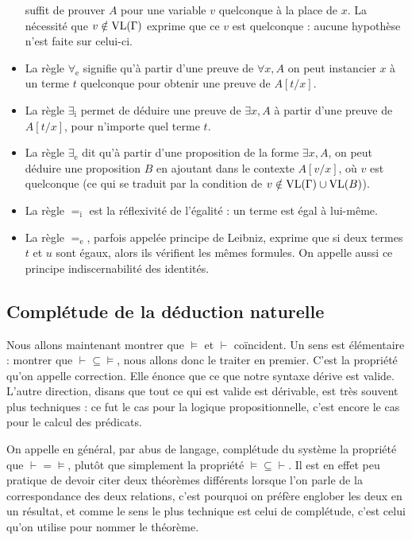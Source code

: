 \begin{itemize}
  suffit de prouver $A$ pour une variable $v$ quelconque à la place de $x$. La
  nécessité que $v\notin\operatorname{VL}(\Gamma)$ exprime que ce $v$ est quelconque : aucune
  hypothèse n'est faite sur celui-ci.
\item La règle $\forall_\mathrm e$ signifie qu'à partir d'une preuve de
  $\forall x, A$ on peut instancier $x$ à un terme $t$ quelconque pour obtenir
  une preuve de $A[t/x]$.
\item La règle $\exists_\mathrm i$ permet de déduire une preuve de $\exists x,A$
  à partir d'une preuve de $A[t/x]$, pour n'importe quel terme $t$.
\item La règle $\exists_\mathrm e$ dit qu'à partir d'une proposition de la forme
  $\exists x, A$, on peut déduire une proposition $B$ en ajoutant dans le
  contexte $A[v/x]$, où $v$ est quelconque (ce qui se traduit par la condition
  de $v\notin\operatorname{VL}(\Gamma)\cup\operatorname{VL}(B)$).
\item La règle $=_\mathrm i$ est la réflexivité de l'égalité : un terme est
  égal à lui-même.
\item La règle $=_\mathrm e$, parfois appelée principe de Leibniz, exprime que
  si deux termes $t$ et $u$ sont égaux, alors ils vérifient les mêmes formules.
  On appelle aussi ce principe \og indiscernabilité des identités\fg{}.
\end{itemize}

\subsection[Théorème de complétude]{Complétude de la déduction naturelle}

Nous allons maintenant montrer que $\vDash$ et $\vdash$ coïncident. Un sens est
élémentaire : montrer que $\vdash \subseteq\vDash$, nous allons donc le traiter
en premier. C'est la propriété qu'on appelle correction. Elle énonce que ce que
notre syntaxe dérive est valide. L'autre direction, disans que tout ce qui est
valide est dérivable, est très souvent plus techniques : ce fut le cas pour
la logique propositionnelle, c'est encore le cas pour le calcul des prédicats.

On appelle en général, par abus de langage, complétude du système la propriété
que $\vdash = \vDash$, plutôt que simplement la propriété
$\vDash\subseteq\vdash$. Il est en effet peu pratique de devoir citer deux
théorèmes différents lorsque l'on parle de la correspondance des deux relations,
c'est pourquoi on préfère englober les deux en un résultat, et comme le sens le
plus technique est celui de complétude, c'est celui qu'on utilise pour nommer le
théorème.

